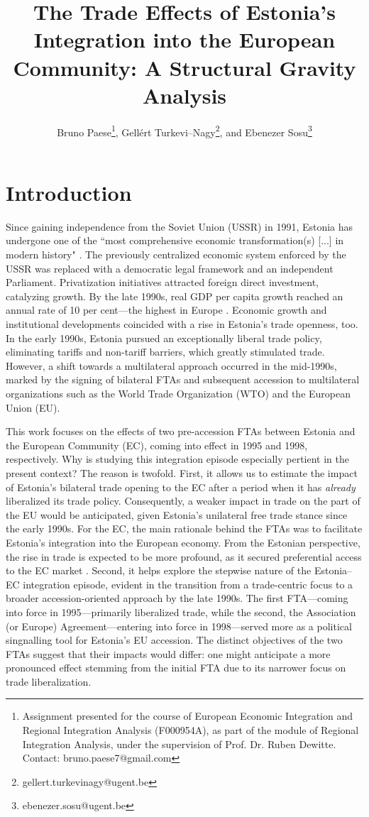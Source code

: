 \documentclass[a4paper,10pt]{article}
\title{The Trade Effects of Estonia's Integration into the European Community: A Structural Gravity Analysis}
\author{Bruno Paese\thanks{Assignment presented for the course of European Economic Integration and Regional Integration Analysis (F000954A), as part of the module of Regional Integration Analysis, under the supervision of Prof. Dr. Ruben Dewitte. Contact: bruno.paese7@gmail.com}, Gellért Turkevi--Nagy\thanks{gellert.turkevinagy@ugent.be}, and Ebenezer Sosu\thanks{ebenezer.sosu@ugent.be}}
\date{}
\begin{document}
	\maketitle
	
\section{Introduction} \label{introduction}

Since gaining independence from the Soviet Union (USSR) in 1991, Estonia has undergone one of the ``most comprehensive economic transformation(s) [...] in modern history" \citep{feldmann_soviet_2002}. The previously centralized economic system enforced by the USSR was replaced with a democratic legal framework and an independent Parliament. Privatization initiatives attracted foreign direct investment, catalyzing growth. By the late 1990s, real GDP per capita growth reached an annual rate of 10 per cent---the highest in Europe \citep{csaba_capitalist_1995,laar_leading_2008}. Economic growth and institutional developments coincided with a rise in Estonia's trade openness, too. In the early 1990s, Estonia pursued an exceptionally liberal trade policy, eliminating tariffs and non-tariff barriers, which greatly stimulated trade. However, a shift towards a multilateral approach occurred in the mid-1990s, marked by the signing of bilateral FTAs and subsequent accession to multilateral organizations such as the World Trade Organization (WTO) and the European Union (EU).

This work focuses on the effects of two pre-accession FTAs between Estonia and the European Community (EC), coming into effect in 1995 and 1998, respectively. Why is studying this integration episode especially pertient in the present context? The reason is twofold. First, it allows us to estimate the impact of Estonia's bilateral trade opening to the EC after a period when it has \textit{already} liberalized its trade policy. Consequently, a weaker impact in trade on the part of the EU would be anticipated, given Estonia's unilateral free trade stance since the early 1990s. For the EC, the main rationale behind the FTAs was to facilitate Estonia's integration into the European economy. From the Estonian perspective, the rise in trade is expected to be more profound, as it secured preferential access to the EC market \citep{feldmann_soviet_2002}. Second, it helps explore the stepwise nature of the Estonia–EC integration episode, evident in the transition from a trade-centric focus to a broader accession-oriented approach by the late 1990s. The first FTA---coming into force in 1995---primarily liberalized trade, while the second, the Association (or Europe) Agreement---entering into force in 1998---served more as a political singnalling tool for Estonia's EU accession. The distinct objectives of the two FTAs suggest that their impacts would differ: one might anticipate a more pronounced effect stemming from the initial FTA due to its narrower focus on trade liberalization.
\end{document}
